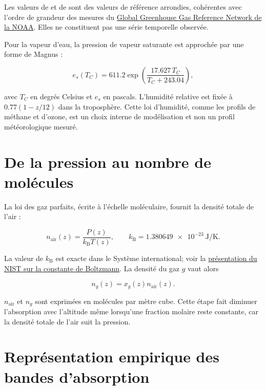 \documentclass[11pt,a4paper]{article}
\begin{document}
Les valeurs de  et de  sont des valeurs de référence
arrondies, cohérentes avec l'ordre de grandeur des mesures du
\href{https://gml.noaa.gov/ccgg/}{Global Greenhouse Gas Reference Network de
la NOAA}. Elles ne constituent pas une série temporelle observée.

Pour la vapeur d'eau, la pression de vapeur saturante est approchée par une
forme de Magnus :

\begin{equation}
  e_s(T_C)=611.2\exp\!\left(\frac{17.627\,T_C}{T_C+243.04}\right),
\end{equation}

avec $T_C$ en degrés Celsius et $e_s$ en pascals. L'humidité relative est
fixée à $0.77(1-z/12)$ dans la troposphère. Cette loi d'humidité, comme les
profils de méthane et d'ozone, est un choix interne de modélisation et non un
profil météorologique mesuré.

\section{De la pression au nombre de molécules}

La loi des gaz parfaits, écrite à l'échelle moléculaire, fournit la densité
totale de l'air :

\begin{equation}
  n_{\mathrm{air}}(z)=\frac{P(z)}{k_{\mathrm B}T(z)},
  \qquad
  k_{\mathrm B}=\SI{1.380649e-23}{\joule\per\kelvin}.
\end{equation}

La valeur de $k_{\mathrm B}$ est exacte dans le Système international; voir la
\href{https://www.nist.gov/si-redefinition/kelvin/kelvin-boltzmann-constant}{présentation
du NIST sur la constante de Boltzmann}. La densité du gaz $g$ vaut alors

\begin{equation}
  n_g(z)=x_g(z)n_{\mathrm{air}}(z).
\end{equation}

$n_{\mathrm{air}}$ et $n_g$ sont exprimées en molécules par mètre cube. Cette
étape fait diminuer l'absorption avec l'altitude même lorsqu'une fraction
molaire reste constante, car la densité totale de l'air suit la pression.

\section{Représentation empirique des bandes d'absorption}
\end{document}
